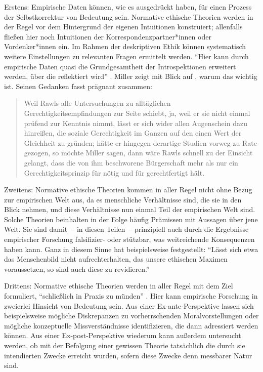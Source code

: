 \documentclass[justified,nobib,nohyper,symmetric,twoside]{tufte-book}
\begin{document}
Erstens: Empirische Daten können, wie es \citet{bar-hillel_judgments_1993} ausgedrückt haben, für einen Prozess der Selbstkorrektur von Bedeutung sein.
Normative ethische Theorien werden in der Regel vor dem Hintergrund der eigenen Intuitionen konstruiert; allenfalls fließen hier noch Intuitionen der Korrespondenzpartner*innen oder Vordenker*innen ein.
Im Rahmen der deskriptiven Ethik können systematisch weitere Einstellungen zu relevanten Fragen ermittelt werden.
\enquote{Hier kann durch empirische Daten quasi die Grundgesamtheit der Introspektionen erweitert werden, über die reflektiert wird} \citep[S.~21]{bauer_zwei_2019}.
Miller zeigt mit Blick auf \citet{rawls_theory_1971}, warum das wichtig ist.
Seinen Gedanken fasst \citet[S.~11]{honneth_philosophie_2008} prägnant zusammen:

\begin{quote}
   Weil Rawls alle Untersuchungen zu alltäglichen Gerechtigkeitsempfindungen zur Seite schiebt, ja, weil er sie nicht einmal prüfend zur Kenntnis nimmt, lässt er sich wider allen Augenschein dazu hinreißen, die soziale Gerechtigkeit im Ganzen auf den einen Wert der Gleichheit zu gründen; hätte er hingegen derartige Studien vorweg zu Rate gezogen, so möchte Miller sagen, dann wäre Rawls schnell zu der Einsicht gelangt, dass die von ihm beschworene Bürgerschaft mehr als nur ein Gerechtigkeitsprinzip für nötig und für gerechtfertigt hält.
\end{quote}

Zweitens: Normative ethische Theorien kommen in aller Regel nicht ohne Bezug zur empirischen Welt aus, da es menschliche Verhältnisse sind, die sie in den Blick nehmen, und diese Verhältnisse nun einmal Teil der empirischen Welt sind.
Solche Theorien beinhalten in der Folge häufig Prämissen mit Aussagen über jene Welt.
Sie sind damit~-- in diesen Teilen~-- prinzipiell auch durch die Ergebnisse empirischer Forschung falsifizier- oder stützbar, was weitreichende Konsequenzen haben kann.
Ganz in diesem Sinne hat beispielsweise \citet[S.~670]{kutschera_empirische_1988} festgestellt: \enquote{Lässt sich etwa das Menschenbild nicht aufrechterhalten, das unsere ethischen Maximen voraussetzen, so sind auch diese zu revidieren.}

Drittens: Normative ethische Theorien werden in aller Regel mit dem Ziel formuliert, \enquote{schließlich in Praxis zu münden} \citep[S.~22]{bauer_zwei_2019}.
Hier kann empirische Forschung in zweierlei Hinsicht von Bedeutung sein.
Aus einer Ex-ante-Perspektive lassen sich beispielsweise mögliche Diskrepanzen zu vorherrschenden Moralvorstellungen oder mögliche konzeptuelle Missverständnisse identifizieren, die dann adressiert werden können.
Aus einer Ex-post-Perspektive wiederum kann außerdem untersucht werden, ob mit der Befolgung einer gewissen Theorie tatsächlich die durch sie intendierten Zwecke erreicht wurden, sofern diese Zwecke denn messbarer Natur sind.
\end{document}
